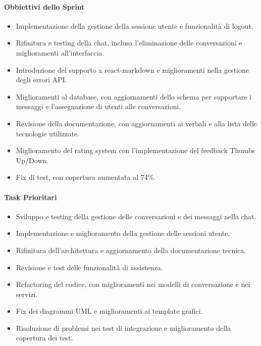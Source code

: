 \documentclass{article}
\begin{document}
            \paragraph{Obbiettivi dello Sprint}
            \begin{itemize}
                \item Implementazione della gestione della sessione utente e funzionalità di logout.
                \item Rifinitura e testing della chat, inclusa l'eliminazione delle conversazioni e miglioramenti all’interfaccia.
                \item Introduzione del supporto a react-markdown e miglioramenti nella gestione degli errori API.
                \item Miglioramenti al database, con aggiornamenti dello schema per supportare i messaggi e l'assegnazione di utenti alle conversazioni.
                \item Revisione della documentazione, con aggiornamenti ai verbali e alla lista delle tecnologie utilizzate.
                \item Miglioramento del rating system con l'implementazione del feedback Thumbs Up/Down.
                \item Fix di test, con copertura aumentata al 74\%.
            \end{itemize}
            
            \paragraph{Task Prioritari}
            \begin{itemize}
                \item Sviluppo e testing della gestione delle conversazioni e dei messaggi nella chat.
                \item Implementazione e miglioramento della gestione delle sessioni utente.
                \item Rifinitura dell'architettura e aggiornamento della documentazione tecnica.
                \item Revisione e test delle funzionalità di assistenza.
                \item Refactoring del codice, con miglioramenti nei modelli di conversazione e nei servizi.
                \item Fix dei diagrammi UML e miglioramenti ai template grafici.
                \item Risoluzione di problemi nei test di integrazione e miglioramento della copertura dei test.
            \end{itemize}
            
\end{document}
